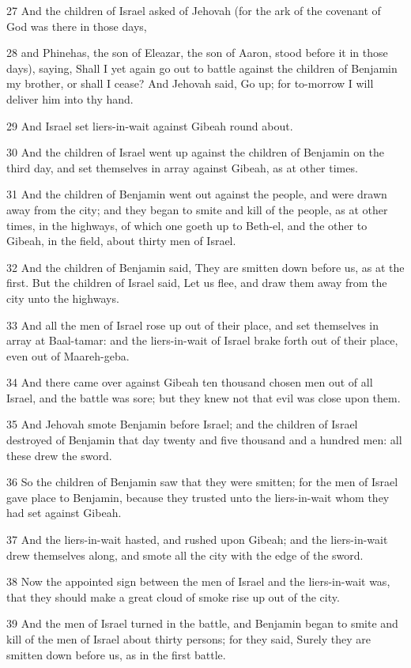 \par 27 And the children of Israel asked of Jehovah (for the ark of the covenant of God was there in those days,
\par 28 and Phinehas, the son of Eleazar, the son of Aaron, stood before it in those days), saying, Shall I yet again go out to battle against the children of Benjamin my brother, or shall I cease? And Jehovah said, Go up; for to-morrow I will deliver him into thy hand.
\par 29 And Israel set liers-in-wait against Gibeah round about.
\par 30 And the children of Israel went up against the children of Benjamin on the third day, and set themselves in array against Gibeah, as at other times.
\par 31 And the children of Benjamin went out against the people, and were drawn away from the city; and they began to smite and kill of the people, as at other times, in the highways, of which one goeth up to Beth-el, and the other to Gibeah, in the field, about thirty men of Israel.
\par 32 And the children of Benjamin said, They are smitten down before us, as at the first. But the children of Israel said, Let us flee, and draw them away from the city unto the highways.
\par 33 And all the men of Israel rose up out of their place, and set themselves in array at Baal-tamar: and the liers-in-wait of Israel brake forth out of their place, even out of Maareh-geba.
\par 34 And there came over against Gibeah ten thousand chosen men out of all Israel, and the battle was sore; but they knew not that evil was close upon them.
\par 35 And Jehovah smote Benjamin before Israel; and the children of Israel destroyed of Benjamin that day twenty and five thousand and a hundred men: all these drew the sword.
\par 36 So the children of Benjamin saw that they were smitten; for the men of Israel gave place to Benjamin, because they trusted unto the liers-in-wait whom they had set against Gibeah.
\par 37 And the liers-in-wait hasted, and rushed upon Gibeah; and the liers-in-wait drew themselves along, and smote all the city with the edge of the sword.
\par 38 Now the appointed sign between the men of Israel and the liers-in-wait was, that they should make a great cloud of smoke rise up out of the city.
\par 39 And the men of Israel turned in the battle, and Benjamin began to smite and kill of the men of Israel about thirty persons; for they said, Surely they are smitten down before us, as in the first battle.
